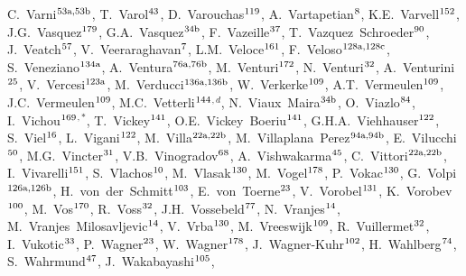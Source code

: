 \begin{flushleft}
C.~Varni$^\textrm{\scriptsize 53a,53b}$,
T.~Varol$^\textrm{\scriptsize 43}$,
D.~Varouchas$^\textrm{\scriptsize 119}$,
A.~Vartapetian$^\textrm{\scriptsize 8}$,
K.E.~Varvell$^\textrm{\scriptsize 152}$,
J.G.~Vasquez$^\textrm{\scriptsize 179}$,
G.A.~Vasquez$^\textrm{\scriptsize 34b}$,
F.~Vazeille$^\textrm{\scriptsize 37}$,
T.~Vazquez~Schroeder$^\textrm{\scriptsize 90}$,
J.~Veatch$^\textrm{\scriptsize 57}$,
V.~Veeraraghavan$^\textrm{\scriptsize 7}$,
L.M.~Veloce$^\textrm{\scriptsize 161}$,
F.~Veloso$^\textrm{\scriptsize 128a,128c}$,
S.~Veneziano$^\textrm{\scriptsize 134a}$,
A.~Ventura$^\textrm{\scriptsize 76a,76b}$,
M.~Venturi$^\textrm{\scriptsize 172}$,
N.~Venturi$^\textrm{\scriptsize 32}$,
A.~Venturini$^\textrm{\scriptsize 25}$,
V.~Vercesi$^\textrm{\scriptsize 123a}$,
M.~Verducci$^\textrm{\scriptsize 136a,136b}$,
W.~Verkerke$^\textrm{\scriptsize 109}$,
A.T.~Vermeulen$^\textrm{\scriptsize 109}$,
J.C.~Vermeulen$^\textrm{\scriptsize 109}$,
M.C.~Vetterli$^\textrm{\scriptsize 144}$$^{,d}$,
N.~Viaux~Maira$^\textrm{\scriptsize 34b}$,
O.~Viazlo$^\textrm{\scriptsize 84}$,
I.~Vichou$^\textrm{\scriptsize 169}$$^{,*}$,
T.~Vickey$^\textrm{\scriptsize 141}$,
O.E.~Vickey~Boeriu$^\textrm{\scriptsize 141}$,
G.H.A.~Viehhauser$^\textrm{\scriptsize 122}$,
S.~Viel$^\textrm{\scriptsize 16}$,
L.~Vigani$^\textrm{\scriptsize 122}$,
M.~Villa$^\textrm{\scriptsize 22a,22b}$,
M.~Villaplana~Perez$^\textrm{\scriptsize 94a,94b}$,
E.~Vilucchi$^\textrm{\scriptsize 50}$,
M.G.~Vincter$^\textrm{\scriptsize 31}$,
V.B.~Vinogradov$^\textrm{\scriptsize 68}$,
A.~Vishwakarma$^\textrm{\scriptsize 45}$,
C.~Vittori$^\textrm{\scriptsize 22a,22b}$,
I.~Vivarelli$^\textrm{\scriptsize 151}$,
S.~Vlachos$^\textrm{\scriptsize 10}$,
M.~Vlasak$^\textrm{\scriptsize 130}$,
M.~Vogel$^\textrm{\scriptsize 178}$,
P.~Vokac$^\textrm{\scriptsize 130}$,
G.~Volpi$^\textrm{\scriptsize 126a,126b}$,
H.~von~der~Schmitt$^\textrm{\scriptsize 103}$,
E.~von~Toerne$^\textrm{\scriptsize 23}$,
V.~Vorobel$^\textrm{\scriptsize 131}$,
K.~Vorobev$^\textrm{\scriptsize 100}$,
M.~Vos$^\textrm{\scriptsize 170}$,
R.~Voss$^\textrm{\scriptsize 32}$,
J.H.~Vossebeld$^\textrm{\scriptsize 77}$,
N.~Vranjes$^\textrm{\scriptsize 14}$,
M.~Vranjes~Milosavljevic$^\textrm{\scriptsize 14}$,
V.~Vrba$^\textrm{\scriptsize 130}$,
M.~Vreeswijk$^\textrm{\scriptsize 109}$,
R.~Vuillermet$^\textrm{\scriptsize 32}$,
I.~Vukotic$^\textrm{\scriptsize 33}$,
P.~Wagner$^\textrm{\scriptsize 23}$,
W.~Wagner$^\textrm{\scriptsize 178}$,
J.~Wagner-Kuhr$^\textrm{\scriptsize 102}$,
H.~Wahlberg$^\textrm{\scriptsize 74}$,
S.~Wahrmund$^\textrm{\scriptsize 47}$,
J.~Wakabayashi$^\textrm{\scriptsize 105}$,

\end{flushleft}
